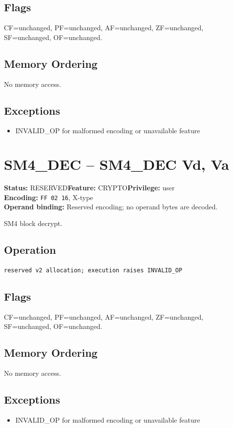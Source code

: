 \documentclass[10pt]{article}
\begin{document}
\subsection*{Flags}
CF=unchanged, PF=unchanged, AF=unchanged, ZF=unchanged, SF=unchanged, OF=unchanged.
\subsection*{Memory Ordering}
No memory access.
\subsection*{Exceptions}
\begin{itemize}
\item INVALID\_OP for malformed encoding or unavailable feature
\end{itemize}
\clearpage

\section{SM4\_DEC -- SM4\_DEC Vd, Va}
\textbf{Status:} RESERVED\quad \textbf{Feature:} CRYPTO\quad \textbf{Privilege:} user\\
\textbf{Encoding:} \texttt{FF 02 16}, X-type\\
\textbf{Operand binding:} Reserved encoding; no operand bytes are decoded.

SM4 block decrypt.

\subsection*{Operation}
\begin{lstlisting}
reserved v2 allocation; execution raises INVALID_OP
\end{lstlisting}
\subsection*{Flags}
CF=unchanged, PF=unchanged, AF=unchanged, ZF=unchanged, SF=unchanged, OF=unchanged.
\subsection*{Memory Ordering}
No memory access.
\subsection*{Exceptions}
\begin{itemize}
\item INVALID\_OP for malformed encoding or unavailable feature
\end{itemize}
\clearpage
\end{document}
